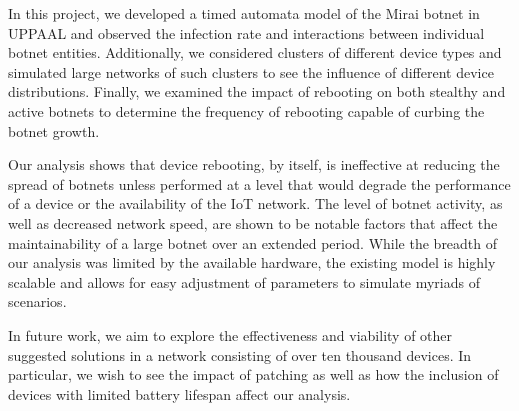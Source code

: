 

In this project, we developed a timed automata model of the Mirai botnet in UPPAAL and observed the infection rate and interactions between individual botnet entities. Additionally, we considered clusters of different device types and simulated large networks of such clusters to see the influence of different device distributions. Finally, we examined the impact of rebooting on both stealthy and active botnets to determine the frequency of rebooting capable of curbing the botnet growth.
\par
Our analysis shows that device rebooting, by itself, is ineffective at reducing the spread of botnets unless performed at a level that would degrade the performance of a device or the availability of the IoT network. The level of botnet activity, as well as decreased network speed, are shown to be notable factors that affect the maintainability of a large botnet over an extended period. While the breadth of our analysis was limited by the available hardware, the existing model is highly scalable and allows for easy adjustment of parameters to simulate myriads of scenarios.
\par
In future work, we aim to explore the effectiveness and viability of other suggested solutions in a network consisting of over ten thousand devices. In particular, we wish to see the impact of patching as well as how the inclusion of devices with limited battery lifespan affect our analysis.

